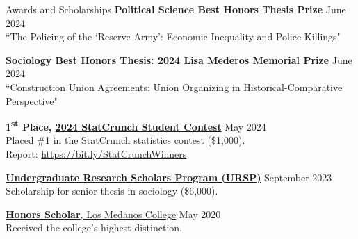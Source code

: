 \documentclass[
	11pt, %
]{resume} %
\begin{document}
\begin{samepage}
\begin{rSection}{Awards and Scholarships}
\textbf{Political Science Best Honors Thesis Prize} \hfill June 2024 \\
``The Policing of the `Reserve Army': Economic Inequality and Police Killings"

\textbf{Sociology Best Honors Thesis: 2024 Lisa Mederos Memorial Prize} \hfill June 2024\\
``Construction Union Agreements: Union Organizing in Historical-Comparative Perspective"

\textbf{1\textsuperscript{st} Place, \href{https://www.pearson.com/content/dam/global-store/en-us/resources/StatCrunch-Contest-Terms-Conditions-Contests-Pearson-Education-Inc.pdf}{2024 StatCrunch Student Contest}} \hfill May 2024\\
Placed \#1 in the StatCrunch statistics contest (\$\thinspace{}1,000).\\
Report: \href{https://bit.ly/StatCrunchWinners}{https://bit.ly/StatCrunchWinners}

\href{https://hass.ugresearch.ucla.edu/scholarships/ursp/students/}{\textbf{Undergraduate Research Scholars Program (URSP)}} \hfill September 2023 \\
Scholarship for senior thesis in sociology (\$\thinspace{}6,000).

\href{https://www.losmedanos.edu/honors/prog.aspx\#:~:text=Honors\%20Scholar\%20Requirements}{\textbf{Honors Scholar}, Los Medanos College} \hfill May 2020 \\
Received the college’s highest distinction.
\end{rSection}
\end{samepage}
\end{document}
